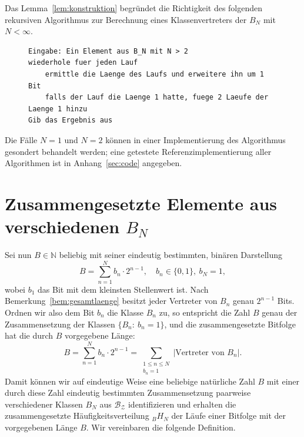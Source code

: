 \documentclass[11pt,a4paper]{scrartcl}
\theoremstyle{plain}
\theoremstyle{definition}
\theoremstyle{remark}
\begin{document}
\noindent Das Lemma~\ref{lem:konstruktion} begründet die Richtigkeit
des folgenden rekursiven Algorithmus zur Berechnung eines
Klassenvertreters der $B_N$ mit $N<\infty$.

\begin{figure}[htbp]
\begin{lstlisting}[caption={Rekursive Berechnung einer Bitfolge aus einem B\_N},label={algo:rekursiv}]
Eingabe: Ein Element aus B_N mit N > 2
wiederhole fuer jeden Lauf
    ermittle die Laenge des Laufs und erweitere ihn um 1 Bit
    falls der Lauf die Laenge 1 hatte, fuege 2 Laeufe der Laenge 1 hinzu
Gib das Ergebnis aus
\end{lstlisting}
\end{figure}

Die Fälle $N=1$ und $N=2$ können in einer Implementierung des
Algorithmus gesondert behandelt werden; eine getestete
Referenzimplementierung aller Algorithmen ist in
Anhang~\ref{sec:code} angegeben.

\section{Zusammengesetzte Elemente aus verschiedenen
\texorpdfstring{$B_N$}{B\_N}}\label{sec:zusammengesetzt}

Sei nun $B\in\mathbb N$ beliebig mit seiner eindeutig bestimmten,
binären Darstellung
\begin{equation}\label{eqn:bindarstellung}
  B = \sum_{n=1}^{N} b_n\cdot 2^{n-1},\quad b_n\in\{0,1\},\ b_N=1,
\end{equation}
wobei $b_1$ das Bit mit dem kleinsten Stellenwert ist. Nach
Bemerkung~\ref{bem:gesamtlaenge} besitzt jeder Vertreter von $B_n$
genau $2^{n-1}$ Bits. Ordnen wir also dem Bit $b_n$ die Klasse $B_n$ zu,
so entspricht die Zahl $B$ genau der Zusammensetzung der Klassen
$\{B_n:\ b_n=1\}$, und die zusammengesetzte Bitfolge hat die durch $B$
vorgegebene Länge:
\begin{equation}\label{eqn:bsummelaufehaeufigkeit}
  B = \sum_{n=1}^{N} b_n\cdot 2^{n-1}
  = \sum_{\substack{1\leq n\leq N\\ b_n=1}}
  \left|\text{Vertreter von } B_n\right|.
\end{equation}
Damit können wir auf eindeutige Weise eine beliebige natürliche Zahl
$B$ mit einer durch diese Zahl eindeutig bestimmten Zusammensetzung
paarweise verschiedener Klassen $B_N$ aus $\mathcal{B_Z}$ identifizieren und erhalten die zusammengesetzte
Häufigkeitsverteilung $_BH_N$ der Läufe einer Bitfolge mit der
vorgegebenen Länge $B$. Wir vereinbaren die folgende Definition.
\end{document}
